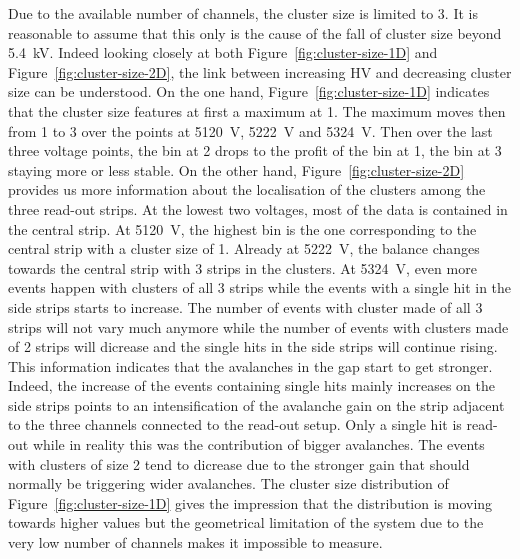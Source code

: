 	Due to the available number of channels, the cluster size is limited to 3. It is reasonable to assume that this only is the cause of the fall of cluster size beyond \SI{5.4}{kV}. Indeed looking closely at both Figure~\ref{fig:cluster-size-1D} and Figure~\ref{fig:cluster-size-2D}, the link between increasing HV and decreasing cluster size can be understood. On the one hand, Figure~\ref{fig:cluster-size-1D} indicates that the cluster size features at first a maximum at 1. The maximum moves then from 1 to 3 over the points at \SI{5120}{V}, \SI{5222}{V} and \SI{5324}{V}. Then over the last three voltage points, the bin at 2 drops to the profit of the bin at 1, the bin at 3 staying more or less stable. On the other hand, Figure~\ref{fig:cluster-size-2D} provides us more information about the localisation of the clusters among the three read-out strips. At the lowest two voltages, most of the data is contained in the central strip. At \SI{5120}{V}, the highest bin is the one corresponding to the central strip with a cluster size of 1. Already at \SI{5222}{V}, the balance changes towards the central strip with 3 strips in the clusters. At \SI{5324}{V}, even more events happen with clusters of all 3 strips while the events with a single hit in the side strips starts to increase. The number of events with cluster made of all 3 strips will not vary much anymore while the number of events with clusters made of 2 strips will dicrease and the single hits in the side strips will continue rising. This information indicates that the avalanches in the gap start to get stronger. Indeed, the increase of the events containing single hits mainly increases on the side strips points to an intensification of the avalanche gain on the strip adjacent to the three channels connected to the read-out setup. Only a single hit is read-out while in reality this was the contribution of bigger avalanches. The events with clusters of size 2 tend to dicrease due to the stronger gain that should normally be triggering wider avalanches. The cluster size distribution of Figure~\ref{fig:cluster-size-1D} gives the impression that the distribution is moving towards higher values but the geometrical limitation of the system due to the very low number of channels makes it impossible to measure.
	

